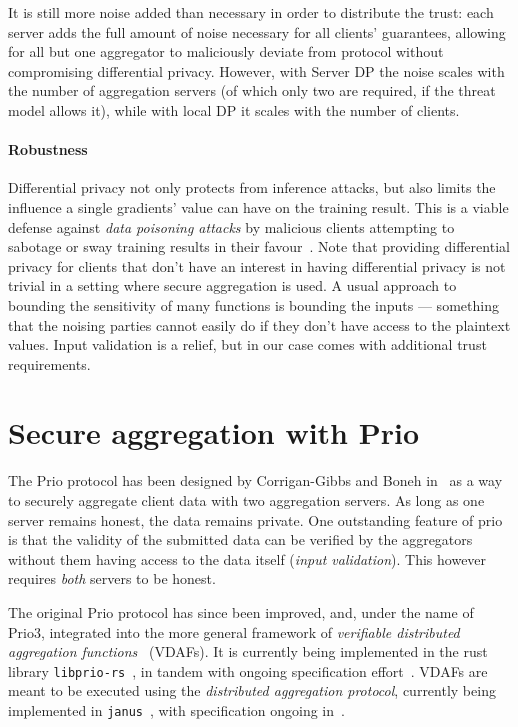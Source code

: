 \documentclass{article}
\begin{document}
It is still more noise added than necessary in order to distribute the trust:
each server adds the full amount of noise necessary for all clients' guarantees,
allowing for all but one aggregator to maliciously deviate from protocol without
compromising differential privacy. However, with Server DP the noise scales with the number of
aggregation servers (of which only two are required, if the threat model allows it), while
with local DP it scales with the number of clients.

\paragraph{Robustness}

Differential privacy not only protects from inference attacks, but also limits the influence a single gradients' value can have on the training result. This is a viable defense against \textit{data poisoning attacks} by malicious clients attempting to sabotage or sway training results in their favour~\cite{Poisoning3,Poisoning2,Poisoning1}. Note that providing differential privacy for clients that don't have an interest in having differential privacy is not trivial in a setting where secure aggregation is used. A usual approach to bounding the sensitivity of many functions is bounding the inputs --- something that the noising parties cannot easily do if they don't have access to the plaintext values. Input validation is a relief, but in our case comes with additional trust requirements.



\section{Secure aggregation with Prio}
The Prio protocol has been designed by Corrigan-Gibbs and Boneh in~\cite{prio} as a
way to securely aggregate client data with two aggregation servers. As long as
one server remains honest, the data remains private. One outstanding feature of
prio is that the validity of the submitted data can be verified by the
aggregators without them having access to the data itself (\textit{input
  validation}). This however requires \emph{both} servers to be honest.

The original Prio protocol has since been improved, and, under the name of Prio3, integrated into the
more general framework of \textit{verifiable distributed aggregation
  functions}~\cite{vdaf} (VDAFs). It is currently being implemented in the rust library
\texttt{libprio-rs}~\cite{libprio-rs}, in tandem with ongoing specification effort~\cite{vdaf-draft}.
VDAFs are meant to be executed using the \textit{distributed aggregation
  protocol}, currently being implemented in \texttt{janus}~\cite{janus}, with
specification ongoing in~\cite{dap-draft}.
\end{document}
